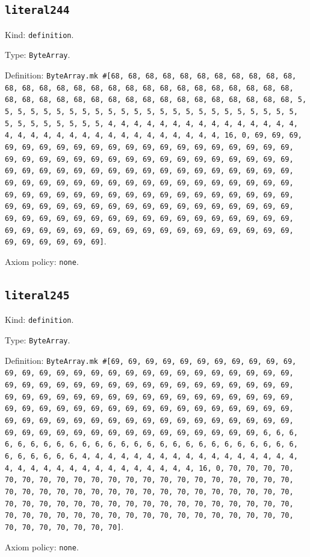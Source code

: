 \documentclass[11pt]{article}
\begin{document}
\subsection*{\texttt{literal244}}
\noindent Kind: \texttt{definition}.\par
\noindent Type: \texttt{ByteArray}.\par
\noindent Definition: \texttt{ByteArray.mk \#[68, 68, 68, 68, 68, 68, 68, 68, 68, 68, 68, 68, 68, 68, 68, 68, 68, 68, 68, 68, 68, 68, 68, 68, 68, 68, 68, 68, 68, 68, 68, 68, 68, 68, 68, 68, 68, 68, 68, 68, 68, 68, 68, 68, 68, 5, 5, 5, 5, 5, 5, 5, 5, 5, 5, 5, 5, 5, 5, 5, 5, 5, 5, 5, 5, 5, 5, 5, 5, 5, 5, 5, 5, 5, 5, 5, 5, 4, 4, 4, 4, 4, 4, 4, 4, 4, 4, 4, 4, 4, 4, 4, 4, 4, 4, 4, 4, 4, 4, 4, 4, 4, 4, 4, 4, 4, 4, 4, 4, 16, 0, 69, 69, 69, 69, 69, 69, 69, 69, 69, 69, 69, 69, 69, 69, 69, 69, 69, 69, 69, 69, 69, 69, 69, 69, 69, 69, 69, 69, 69, 69, 69, 69, 69, 69, 69, 69, 69, 69, 69, 69, 69, 69, 69, 69, 69, 69, 69, 69, 69, 69, 69, 69, 69, 69, 69, 69, 69, 69, 69, 69, 69, 69, 69, 69, 69, 69, 69, 69, 69, 69, 69, 69, 69, 69, 69, 69, 69, 69, 69, 69, 69, 69, 69, 69, 69, 69, 69, 69, 69, 69, 69, 69, 69, 69, 69, 69, 69, 69, 69, 69, 69, 69, 69, 69, 69, 69, 69, 69, 69, 69, 69, 69, 69, 69, 69, 69, 69, 69, 69, 69, 69, 69, 69, 69, 69, 69, 69, 69, 69, 69, 69, 69, 69, 69, 69, 69, 69, 69, 69, 69, 69, 69, 69, 69, 69]}.\par
\noindent Axiom policy: \texttt{none}.\par
\subsection*{\texttt{literal245}}
\noindent Kind: \texttt{definition}.\par
\noindent Type: \texttt{ByteArray}.\par
\noindent Definition: \texttt{ByteArray.mk \#[69, 69, 69, 69, 69, 69, 69, 69, 69, 69, 69, 69, 69, 69, 69, 69, 69, 69, 69, 69, 69, 69, 69, 69, 69, 69, 69, 69, 69, 69, 69, 69, 69, 69, 69, 69, 69, 69, 69, 69, 69, 69, 69, 69, 69, 69, 69, 69, 69, 69, 69, 69, 69, 69, 69, 69, 69, 69, 69, 69, 69, 69, 69, 69, 69, 69, 69, 69, 69, 69, 69, 69, 69, 69, 69, 69, 69, 69, 69, 69, 69, 69, 69, 69, 69, 69, 69, 69, 69, 69, 69, 69, 69, 69, 69, 69, 69, 69, 69, 69, 69, 69, 69, 69, 69, 69, 69, 69, 69, 69, 69, 6, 6, 6, 6, 6, 6, 6, 6, 6, 6, 6, 6, 6, 6, 6, 6, 6, 6, 6, 6, 6, 6, 6, 6, 6, 6, 6, 6, 6, 6, 6, 6, 4, 4, 4, 4, 4, 4, 4, 4, 4, 4, 4, 4, 4, 4, 4, 4, 4, 4, 4, 4, 4, 4, 4, 4, 4, 4, 4, 4, 4, 4, 4, 4, 16, 0, 70, 70, 70, 70, 70, 70, 70, 70, 70, 70, 70, 70, 70, 70, 70, 70, 70, 70, 70, 70, 70, 70, 70, 70, 70, 70, 70, 70, 70, 70, 70, 70, 70, 70, 70, 70, 70, 70, 70, 70, 70, 70, 70, 70, 70, 70, 70, 70, 70, 70, 70, 70, 70, 70, 70, 70, 70, 70, 70, 70, 70, 70, 70, 70, 70, 70, 70, 70, 70, 70, 70, 70, 70, 70, 70, 70, 70, 70, 70]}.\par
\noindent Axiom policy: \texttt{none}.\par
\end{document}
